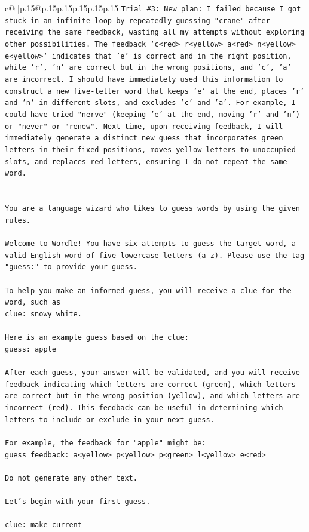 \documentclass{article}
\begin{document}
{\begin{supertabular}{c@{$\;$}|p{.15\linewidth}@{}p{.15\linewidth}p{.15\linewidth}p{.15\linewidth}p{.15\linewidth}p{.15\linewidth}}
{{{\texttt{Trial \#3: New plan: I failed because I got stuck in an infinite loop by repeatedly guessing "crane" after receiving the same feedback, wasting all my attempts without exploring other possibilities. The feedback `c<red> r<yellow> a<red> n<yellow> e<yellow>` indicates that 'e' is correct and in the right position, while 'r', 'n' are correct but in the wrong positions, and 'c', 'a' are incorrect. I should have immediately used this information to construct a new five{-}letter word that keeps 'e' at the end, places 'r' and 'n' in different slots, and excludes 'c' and 'a'. For example, I could have tried "nerve" (keeping 'e' at the end, moving 'r' and 'n') or "never" or "renew". Next time, upon receiving feedback, I will immediately generate a distinct new guess that incorporates green letters in their fixed positions, moves yellow letters to unoccupied slots, and replaces red letters, ensuring I do not repeat the same word.} \\
\\ 
\\ 
\texttt{You are a language wizard who likes to guess words by using the given rules.} \\
\\ 
\texttt{Welcome to Wordle! You have six attempts to guess the target word, a valid English word of five lowercase letters (a{-}z). Please use the tag "guess:" to provide your guess.} \\
\\ 
\texttt{To help you make an informed guess, you will receive a clue for the word, such as} \\
\texttt{clue: snowy white.} \\
\\ 
\texttt{Here is an example guess based on the clue: } \\
\texttt{guess: apple} \\
\\ 
\texttt{After each guess, your answer will be validated, and you will receive feedback indicating which letters are correct (green), which letters are correct but in the wrong position (yellow), and which letters are incorrect (red). This feedback can be useful in determining which letters to include or exclude in your next guess.} \\
\\ 
\texttt{For example, the feedback for "apple" might be:} \\
\texttt{guess\_feedback: a<yellow> p<yellow> p<green> l<yellow> e<red>} \\
\\ 
\texttt{Do not generate any other text.} \\
\\ 
\texttt{Let's begin with your first guess.} \\
\\ 
\texttt{clue: make current} \\
            }
        }
    }
     \\ \\


\end{supertabular}}
\end{document}

